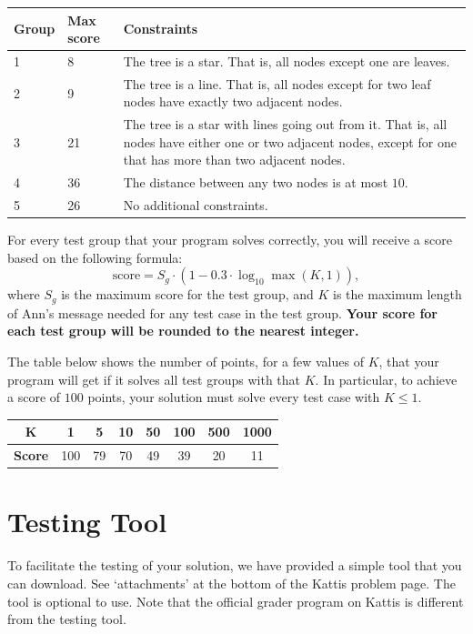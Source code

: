 \begin{tabular}{|l|l|l|}
\hline
Group  &  Max score  &  Constraints \\
\hline
 1 & 8 & The tree is a star. That is, all nodes except one are leaves.   \\
\hline
 2 & 9 & The tree is a line. That is, all nodes except for two leaf nodes have exactly two adjacent nodes.  \\
\hline
 3 & 21 & The tree is a star with lines going out from it. That is, all nodes have either one or two adjacent nodes, except for one that has more than two adjacent nodes.   \\
\hline
 4 & 36 & The distance between any two nodes is at most $10$.   \\
\hline
 5 & 26 & No additional constraints.  \\
\hline
\end{tabular}

For every test group that your program solves correctly, you will receive a score based on the following formula:
\[\text{score} = S_g \cdot \left(1 - 0.3 \cdot \log_{10} \max(K, 1) \right),\]
where $S_g$ is the maximum score for the test group,
and $K$ is the maximum length of Ann's message needed
for any test case in the test group.
\textbf{Your score for each test group will be rounded to the nearest integer.}

The table below shows the number of points, for a few values of $K$, that your program will get if it solves all test groups with that $K$.
In particular, to achieve a score of $100$ points, your solution must solve every test case with $K\le 1$. 

\begin{tabular}{|c|c|c|c|c|c|c|c|}
    \hline
    \textbf{K}  &  1  &  5 & 10 & 50 & 100 & 500 & 1000  \\
    \hline
    \textbf{Score} & 100 & 79 & 70 & 49 & 39 & 20 & 11   \\
    \hline
\end{tabular}

\section*{Testing Tool}
To facilitate the testing of your solution, we have provided a simple tool that you can download.
See `attachments' at the bottom of the Kattis problem page.
The tool is optional to use. Note that the official grader program on Kattis is different from the testing tool.

